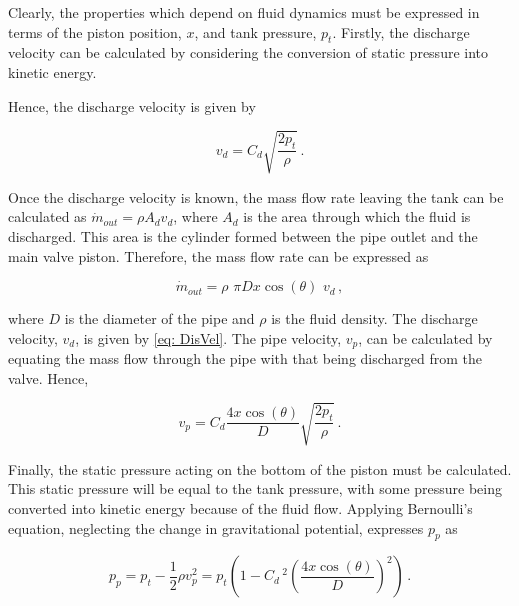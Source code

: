 Clearly, the properties which depend on fluid dynamics must be expressed in terms of the piston position, $x$, and tank pressure, $p_t$. Firstly, the discharge velocity can be calculated by considering the conversion of static pressure into kinetic energy.

Hence, the discharge velocity is given by

\begin{equation} \label{eq: DisVel}
    v_d = C_d \sqrt{\frac{2 p_t}{\rho}} \, .
\end{equation}

Once the discharge velocity is known, the mass flow rate leaving the tank can be calculated as $\dot{m}_{out} = \rho A_d v_d$, where $A_d$ is the area through which the fluid is discharged. This area is the cylinder formed between the pipe outlet and the main valve piston. Therefore, the mass flow rate can be expressed as

\begin{equation} \label{eq: ValveMassDischarge}
    \dot{m}_{out} =
    \rho \,\, \pi D x \cos(\theta) \,\, v_d \, ,
\end{equation}

where $D$ is the diameter of the pipe and $\rho$ is the fluid density. The discharge velocity, $v_d$, is given by \cref{eq: DisVel}. The pipe velocity, $v_p$, can be calculated by equating the mass flow through the pipe with that being discharged from the valve. Hence,

\begin{equation*}
    v_p = C_d \frac{4 x \cos(\theta)}{D} \sqrt{\frac{2 p_t}{\rho}} \, .
\end{equation*}

Finally, the static pressure acting on the bottom of the piston must be calculated. This static pressure will be equal to the tank pressure, with some pressure being converted into kinetic energy because of the fluid flow. Applying Bernoulli's equation, neglecting the change in gravitational potential, expresses $p_p$ as

\begin{equation*}
    p_p = p_t - \frac{1}{2} \rho v_p ^2 =
    p_t \left( 1 - C_d \,^2 \left( \frac{4 x \cos(\theta)}{D} \right)^2 \right) \, .
\end{equation*}

